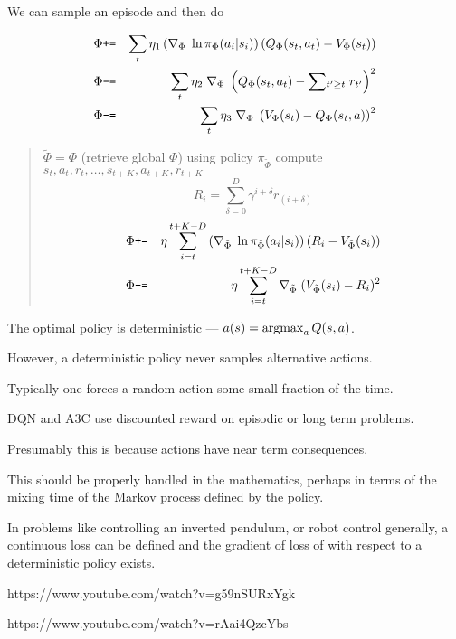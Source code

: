 {We can sample an episode and then do

\begin{eqnarray*}
  \Phi  &\mbox{\tt +=} & \sum_t \eta_1\left(\nabla_{\Phi}\;\ln \pi_{\Phi}(a_i|s_i)\right)(Q_\Phi(s_t,a_t) - V_\Phi(s_t))\\
  \Phi & \mbox{\tt -=} & \sum_t \eta_2 \;\nabla_{\Phi}\;\left(Q_\Phi(s_t,a_t) - \sum \!_{t' \geq t}\; r_{t'}\right)^2 \\
  \Phi & \mbox{\tt -=} & \sum_t \eta_3 \;\nabla_{\Phi}\;\left(V_\Phi(s_t) - Q_\Phi(s_t,a)\right)^2 \\
\end{eqnarray*}



\begin{quotation}
  \noindent $\tilde{\Phi} = \Phi$ (retrieve global $\Phi$)\newline
  \noindent using policy $\pi_{\tilde{\Phi}}$ compute $s_t,a_t,r_t,\ldots,s_{t+K},a_{t+K},r_{t+K}$
  $$R_i = \sum_{\delta=0}^D \gamma^{i+\delta} r_{(i+\delta)}$$
  \begin{eqnarray*}
  \Phi  &\mbox{\tt +=} & \eta \sum_{i=t}^{t+K-D} \left(\nabla_{\tilde{\Phi}}\;\ln \pi_{\tilde{\Phi}}(a_i|s_i)\right)\left(R_i - V_{\tilde{\Phi}}(s_i)\right)\\
  \Phi & \mbox{\tt -=} & \eta \sum_{i=t}^{t+K-D} \nabla_{\tilde{\Phi}}\;(V_{\tilde{\Phi}}(s_i) - R_i)^2
  \end{eqnarray*}
\end{quotation}


The optimal policy is deterministic --- $a(s) = \operatorname*{argmax}_a Q(s,a)$.

\vfill
However, a deterministic policy never samples alternative actions.

\vfill
Typically one forces a random action some small fraction of the time.



DQN and A3C use discounted reward on episodic or long term problems.

\vfill
Presumably this is because actions have near term consequences.

\vfill
This should be properly handled in the mathematics, perhaps in terms of the mixing time of
the Markov process defined by the policy.


In problems like controlling an inverted pendulum, or robot control generally,
a continuous loss can be defined and the gradient of loss of with respect to a deterministic policy exists.


https://www.youtube.com/watch?v=g59nSURxYgk

https://www.youtube.com/watch?v=rAai4QzcYbs




}



